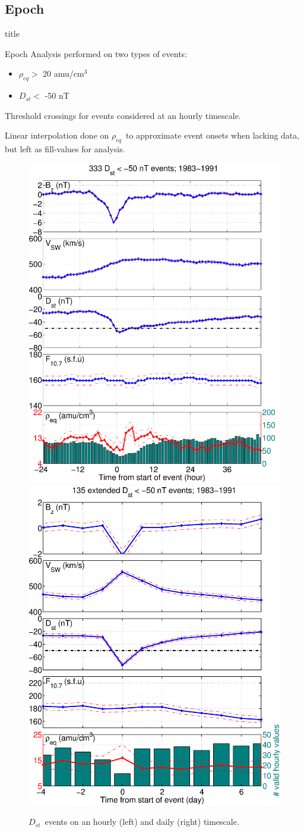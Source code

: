 \documentclass[xcolor={dvipsnames,table}]{beamer}
\newcommand{\subheader}{    		\begin{center}
  	\begin{beamercolorbox}[sep=4pt,center,shadow=true,rounded=true]{title}
  		\usebeamerfont{title}\subsecname\par%
  	\end{beamercolorbox}
  	\vfill
  	\end{center}}
\newcommand{\req}{\ensuremath{\rho_{eq}}} %
\newcommand{\dst}{\ensuremath{D_{st}}} %
\begin{document}
\subsection{Epoch}

\begin{frame}
	\subheader
	Epoch Analysis performed on two types of events:
	\begin{itemize}
		\item $\req >$ 20 amu/cm$^3$
		\item $\dst <$ -50 nT
	\end{itemize}
	Threshold crossings for events considered at an hourly timescale.
	\newline
	
	Linear interpolation done on \req\ to approximate event onsets when lacking data, but left as fill-values for analysis. 
\end{frame}


\begin{frame}
	\begin{figure}[htp!]
		\centering
		\includegraphics[width=0.5\linewidth]{Figures/StormAvs/stormavs-dst-GOES6}
		\includegraphics[width=0.5\linewidth]{Figures/StormAvs/stormavs-dst-day-GOES6}
		\caption{\dst\ events on an hourly (left) and daily (right) timescale.}
		\label{fig:EpochDst}
	\end{figure}
\end{frame}
\end{document}

